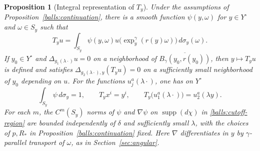\documentclass[11pt,a4paper]{article}
\newtheorem{proposition}[theorem]{Proposition}
\theoremstyle{definition}
\theoremstyle{remark}
\numberwithin{equation}{section}
\begin{document}
\begin{proposition}[Integral representation of $T_y$]\label{balls:functional}
Under the assumptions of Proposition~\ref{balls:continuation}, there is
a smooth function $\psi(y,\omega)$ for $y\in Y^\circ$ and $\omega\in S_y$
such that
\begin{equation}\label{balls:density-representation}
 T_yu=\int_{S_y}\psi(y,\omega)
              u\bigl(\exp_y^\gamma(r(y)\omega)\bigr)\,d\sigma_y(\omega).
\end{equation}
If $y_0\in Y^\circ$ and $\Delta_{g_1(\lambda\cdot)}u=0$ on a neighborhood
of $\overline{B_\gamma(y_0,r(y_0))}$, then $y\mapsto T_yu$ is defined
and satisfies $\Delta_{g_2(\lambda\cdot),y}(T_yu)=0$ on a sufficiently
small neighborhood of $y_0$ depending on $u$.
For the functions $u_j^a(\lambda\cdot)$, one has on $Y^\circ$
\begin{equation}\label{balls:reproduction}
 \int_{S_y}\psi\,d\sigma_y=1,
 \qquad T_yx^i=y^i,
 \qquad T_y\bigl(u_1^a(\lambda\cdot)\bigr)=u_2^a(\lambda y).
\end{equation}
For each $m$, the $C^m(S_y)$ norms of $\psi$ and $\nabla\psi$ on
$\operatorname{supp}(d\chi)$ in \eqref{balls:cutoff-region} are bounded
independently of $\delta$ and sufficiently small $\lambda$, with the
choices of $p,R_*$ in Proposition~\ref{balls:continuation} fixed.
Here $\nabla$ differentiates in $y$ by $\gamma$-parallel transport
of $\omega$, as in Section~\ref{sec:angular}.
\end{proposition}
\end{document}
